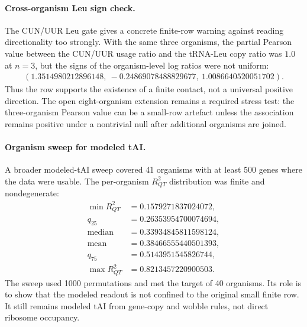 \paragraph{Cross-organism Leu sign check.}
The CUN/UUR Leu gate gives a concrete finite-row warning against reading directionality too strongly.  With the same three organisms, the partial Pearson value between the CUN/UUR usage ratio and the tRNA-Leu copy ratio was $1.0$ at $n=3$, but the signs of the organism-level log ratios were not uniform:
$$
\begin{aligned}
(1.3514980212896148,\ -0.24869078488829677,\ 1.0086640520051702).
\end{aligned}
$$
Thus the row supports the existence of a finite contact, not a universal positive direction.  The open eight-organism extension remains a required stress test: the three-organism Pearson value can be a small-row artefact unless the association remains positive under a nontrivial null after additional organisms are joined.

\paragraph{Organism sweep for modeled tAI.}
A broader modeled-tAI sweep covered 41 organisms with at least 500 genes where the data were usable.  The per-organism $R^2_{QT}$ distribution was finite and nondegenerate:
$$
\begin{aligned}
\min R^2_{QT} &= 0.1579271837024072,\\
q_{25} &= 0.26353954700074694,\\
\operatorname{median} &= 0.33934845811598124,\\
\operatorname{mean} &= 0.38466555440501393,\\
q_{75} &= 0.5143951545826744,\\
\max R^2_{QT} &= 0.8213457220900503.
\end{aligned}
$$
The sweep used 1000 permutations and met the target of 40 organisms.  Its role is to show that the modeled readout is not confined to the original small finite row.  It still remains modeled tAI from gene-copy and wobble rules, not direct ribosome occupancy.

